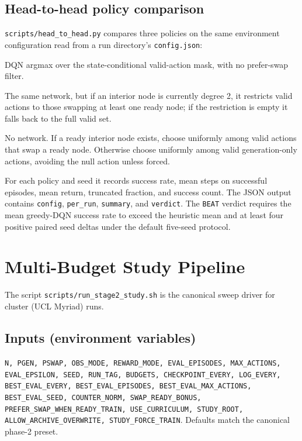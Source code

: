 \documentclass[11pt]{article}
\newcommand{\code}[1]{\texttt{#1}}
\newcommand{\file}[1]{\texttt{\small #1}}
\begin{document}
\subsection{Head-to-head policy comparison}
\file{scripts/head\_to\_head.py} compares three policies on the same environment configuration read from a run directory's \file{config.json}:
\begin{description}[leftmargin=2em]
  \item[\code{dqn\_greedy}] DQN argmax over the state-conditional valid-action mask, with no prefer-swap filter.
  \item[\code{dqn\_swapprefer}] The same network, but if an interior node is currently degree 2, it restricts valid actions to those swapping at least one ready node; if the restriction is empty it falls back to the full valid set.
  \item[\code{heuristic}] No network. If a ready interior node exists, choose uniformly among valid actions that swap a ready node. Otherwise choose uniformly among valid generation-only actions, avoiding the null action unless forced.
\end{description}
For each policy and seed it records success rate, mean steps on successful episodes, mean return, truncated fraction, and success count. The JSON output contains \code{config}, \code{per\_run}, \code{summary}, and \code{verdict}. The \code{BEAT} verdict requires the mean greedy-DQN success rate to exceed the heuristic mean and at least four positive paired seed deltas under the default five-seed protocol.

\section{Multi-Budget Study Pipeline}
\label{sec:stage2}

The script \file{scripts/run\_stage2\_study.sh} is the canonical sweep driver for cluster (UCL Myriad) runs.

\subsection{Inputs (environment variables)}
\code{N, PGEN, PSWAP, OBS\_MODE, REWARD\_MODE, EVAL\_EPISODES, MAX\_ACTIONS, EVAL\_EPSILON, SEED, RUN\_TAG, BUDGETS, CHECKPOINT\_EVERY, LOG\_EVERY, BEST\_EVAL\_EVERY, BEST\_EVAL\_EPISODES, BEST\_EVAL\_MAX\_ACTIONS, BEST\_EVAL\_SEED, COUNTER\_NORM, SWAP\_READY\_BONUS, PREFER\_SWAP\_WHEN\_READY\_TRAIN, USE\_CURRICULUM, STUDY\_ROOT, ALLOW\_ARCHIVE\_OVERWRITE, STUDY\_FORCE\_TRAIN}. Defaults match the canonical phase-2 preset.
\end{document}
